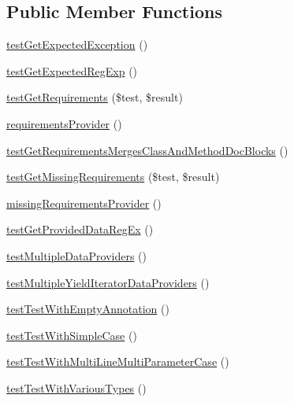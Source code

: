 \subsection*{Public Member Functions}
\begin{DoxyCompactItemize}
\item 
\mbox{\hyperlink{class_util___test_test_a320a0e49f3b9ec62e59cd2fc37b9fae3}{test\+Get\+Expected\+Exception}} ()
\item 
\mbox{\hyperlink{class_util___test_test_a28ca45b75d1c97105de6d257d98c3356}{test\+Get\+Expected\+Reg\+Exp}} ()
\item 
\mbox{\hyperlink{class_util___test_test_a54ee59b4a21e55206f788755363f2cec}{test\+Get\+Requirements}} (\$test, \$result)
\item 
\mbox{\hyperlink{class_util___test_test_a9072c44e3e8a50196e7410ca9e2e96d2}{requirements\+Provider}} ()
\item 
\mbox{\hyperlink{class_util___test_test_ad44a1754603a697e8d3bc60f7e19b3eb}{test\+Get\+Requirements\+Merges\+Class\+And\+Method\+Doc\+Blocks}} ()
\item 
\mbox{\hyperlink{class_util___test_test_ac718df477b9fbf20d0d938564c1c9416}{test\+Get\+Missing\+Requirements}} (\$test, \$result)
\item 
\mbox{\hyperlink{class_util___test_test_af842bf9c0e6248668d5c4775d8814db8}{missing\+Requirements\+Provider}} ()
\item 
\mbox{\hyperlink{class_util___test_test_ad6e884a3be0e19f95f541dbe1f3119c5}{test\+Get\+Provided\+Data\+Reg\+Ex}} ()
\item 
\mbox{\hyperlink{class_util___test_test_ae7522b53cf6accfb81f0b622bacb5009}{test\+Multiple\+Data\+Providers}} ()
\item 
\mbox{\hyperlink{class_util___test_test_af43dbc10d706527dc1ec953d1aa7b63f}{test\+Multiple\+Yield\+Iterator\+Data\+Providers}} ()
\item 
\mbox{\hyperlink{class_util___test_test_a73c5284205077ee28479f7f7419c1d5c}{test\+Test\+With\+Empty\+Annotation}} ()
\item 
\mbox{\hyperlink{class_util___test_test_a625c8e40003e87d402d492c8b1663704}{test\+Test\+With\+Simple\+Case}} ()
\item 
\mbox{\hyperlink{class_util___test_test_ab35866cd092896d74e637874b2be1daa}{test\+Test\+With\+Multi\+Line\+Multi\+Parameter\+Case}} ()
\item 
\mbox{\hyperlink{class_util___test_test_aa41174eef3c26e18d2011724baa4eff5}{test\+Test\+With\+Various\+Types}} ()
\item 

\end{DoxyCompactItemize}
